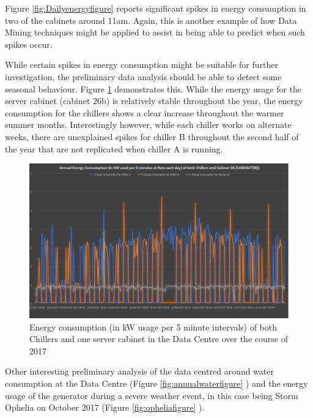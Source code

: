 \documentclass[12pt]{scrartcl}
\begin{document}
Figure \ref{fig:Dailyenergyfigure} reports significant spikes in energy consumption in two of the cabinets around 11am. Again, this is another example of how Data Mining techniques might be applied to assist in being able to predict when such spikes occur. 

While certain spikes in energy consumption might be suitable for further investigation, the preliminary data analysis should be able to detect some seasonal behaviour. Figure \ref{fig:cabvchillerfigure} demonstrates this. While the energy usage for the server cabinet (cabinet 26b) is relatively stable throughout the year, the energy consumption for the chillers shows a clear increase throughout the warmer summer months. Interestingly however, while each chiller works on alternate weeks, there are unexplained spikes for chiller B throughout the second half of the year that are not replicated when chiller A is running. 

\begin{figure}[h]
  \caption{Energy consumption (in kW usage per 5 minute intervals) of both Chillers and one server cabinet in the Data Centre over the course of 2017}
  \label{fig:cabvchillerfigure}
  \centering
    \includegraphics[scale=0.45]{Energy_consumption_of_cab26_and_chillers.png}
\end{figure} 

Other interesting preliminary analysis of the data centred around water consumption at the Data Centre (Figure \ref{fig:annualwaterfigure} ) and the energy usage of the generator during a severe weather event, in this case being Storm Ophelia on October 2017 (Figure \ref{fig:opheliafigure} ). 
\end{document}
